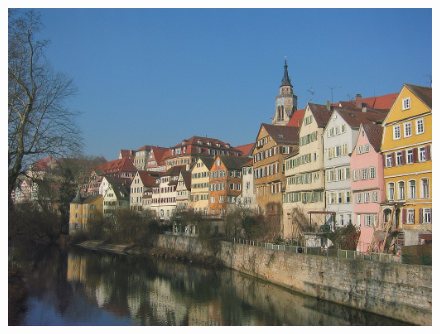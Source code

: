 \documentclass{article}
\begin{document}
\begin{figure}[htp]
\begin{minipage}{0.3\linewidth}
    \includegraphics[width=\textwidth]{img/content/block3_conv1}
    \end{minipage}

\medskip


\end{figure}
\end{document}
